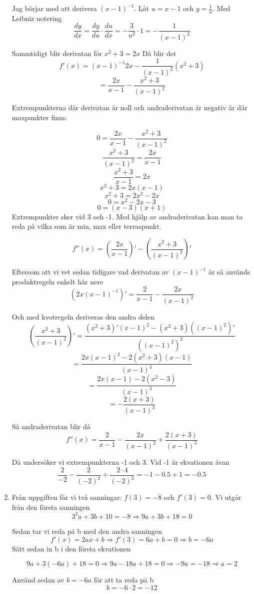 \documentclass[a4paper,12pt]{article}
\begin{document}
\begin{enumerate}
    Jag börjar med att derivera $(x-1)^{-1}$.
    Låt $u=x-1$ och $y=\frac{1}{u}$.
    Med Leibniz notering 
    $$\frac{dy}{dx}=\frac{dy}{du}\cdot \frac{du}{dx}
    =-\frac{3}{u^2}\cdot 1=-\frac{1}{(x-1)^2}$$
    
    Sammtidigt blir derivatan för $x^2+3=2x$
    Då blir det 
    $$f'(x)=(x-1)^{-1}2x-\frac{1}{(x-1)^2}(x^2+3)$$
    $$=\frac{2x}{x-1}-\frac{x^2+3}{(x-1)^2}$$
    
    Extrempunkterna där derivatan är noll och
    andraderivatan är negativ är där 
    maxpunkter finns. 
    
    $$0=\frac{2x}{x-1}-\frac{x^2+3}{(x-1)^2}$$
    $$\frac{x^2+3}{(x-1)^2}=\frac{2x}{x-1}$$
    $$\frac{x^2+3}{x-1}={2x}$$
    $$x^2+3=2x(x-1)$$
    $$x^2+3=2x^2-2x$$
    $$0=x^2-2x-3$$
    $$0=(x-3)(x+1)$$
    Extrempunkter sker vid 3 och -1. Med hjälp av andraderivatan
    kan man ta reda på vilka som är min, max eller terraspunkt.
    
    $$f''(x)=(\frac{2x}{x-1})'-(\frac{x^2+3}{(x-1)^2})'$$
    
    Eftersom att vi vet sedan tidigare vad derivatan av 
    $(x-1)^{-1}$ är så används produktregeln enkelt här nere
    $$(2x(x-1)^{-1})'=\frac{2}{x-1}-\frac{2x}{(x-1)^2}$$
    
    Och med kvotregeln deriveras den andra delen
    $$(\frac{x^2+3}{(x-1)^2})'
    =\frac{(x^2+3)'(x-1)^2 - (x^2+3)((x-1)^2)'}{((x-1)^2)^2}$$
    $$=\frac{2x(x-1)^2-2(x^2+3)(x-1)}{(x-1)^4}$$
    $$=\frac{2x(x-1)-2(x^2-3)}{(x-1)^3}$$
    $$=-\frac{2(x+3)}{(x-1)^3}$$

    Så andraderivatan blir då
    $$f''(x)=\frac{2}{x-1}-\frac{2x}{(x-1)^2}+\frac{2(x+3)}{(x-1)^3}$$
    
    Då undersöker vi extrempunkterna -1 och 3. Vid -1 är ekvationen åvan
    $$\frac{2}{-2}-\frac{2}{(-2)^2}+\frac{2\cdot 4}{(-2)^3}
    = -1-0.5+1=-0.5$$

    \item 
    Från uppgiften får vi två sanningar: $f(3)=-8$ och $f'(3)=0$. 
    Vi utgår från den första sanningen
    $$3^2a+3b+10=-8\Rightarrow 9a+3b+18=0$$

    Sedan tar vi reda på b med den andra sanningen
    $$f'(x)=2ax+b\Rightarrow f'(3)=6a+b=0\Rightarrow b=-6a$$
    Sätt sedan in b i den första ekvationen

    $$9a+3(-6a)+18=0\Rightarrow 9a-18a+18=0 
    \Rightarrow -9a=-18\Rightarrow a=2$$

    Använd sedan av $b=-6a$ för att ta reda på b
    $$b=-6\cdot 2= -12$$


\end{enumerate}
\end{document}
